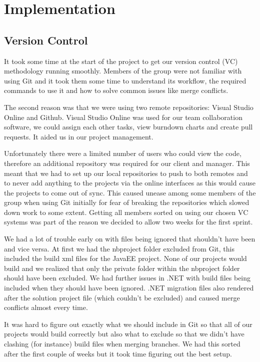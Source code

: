 \chapter{Implementation}

\section{Version Control}
It took some time at the start of the project to get our version control (VC) methodology running smoothly. Members of the group were not familiar with using Git and it took them some time to understand its workflow, the required commands to use it and how to solve common issues like merge conflicts. \par
The second reason was that we were using two remote repositories: Visual Studio Online\cite{VSO} and Github\cite{Github}. Visual Studio Online was used for our team collaboration software, we could assign each other tasks, view burndown charts and create pull requests. It aided us in our project management. \par
Unfortunately there were a limited number of users who could view the code, therefore an additional repository was required for our client and manager. This meant that we had to set up our local repositories to push to both remotes and to never add anything to the projects via the online interfaces as this would cause the projects to come out of sync. This caused unease among some members of the group when using Git initially for fear of breaking the repositories which slowed down work to some extent. Getting all members sorted on using our chosen VC systems was part of the reason we decided to allow two weeks for the first sprint. \par
We had a lot of trouble early on with files being ignored that shouldn’t have been and vice versa. At first we had the nbproject folder excluded from Git, this included the build xml files for the JavaEE project. None of our projects would build and we realized that only the private folder within the nbproject folder should have been excluded. We had further issues in .NET with build files being included when they should have been ignored. .NET migration files also rendered after the solution project file (which couldn’t be excluded) and caused merge conflicts almost every time. \par
It was hard to figure out exactly what we should include in Git so that all of our projects would build correctly but also what to exclude so that we didn’t have clashing (for instance) build files when merging branches. We had this sorted after the first couple of weeks but it took time figuring out the best setup. 
